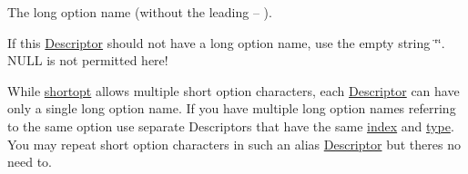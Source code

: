 The long option name (without the leading {\ttfamily --} ). 

If this \hyperlink{structoption_1_1Descriptor}{Descriptor} should not have a long option name, use the empty string \char`\"{}\char`\"{}. N\+U\+LL is not permitted here!

While \hyperlink{structoption_1_1Descriptor_a0dba4ccca59c19d6ed4081391fca5adb}{shortopt} allows multiple short option characters, each \hyperlink{structoption_1_1Descriptor}{Descriptor} can have only a single long option name. If you have multiple long option names referring to the same option use separate Descriptors that have the same \hyperlink{structoption_1_1Descriptor_a1fee8ac44f529c99ac2b1149b4c391b1}{index} and \hyperlink{structoption_1_1Descriptor_a1b220dabd8aad075fa441a80f9b9343c}{type}. You may repeat short option characters in such an alias \hyperlink{structoption_1_1Descriptor}{Descriptor} but there\textquotesingle{}s no need to.

